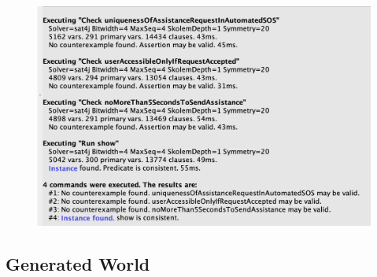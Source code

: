 \documentclass[12pt,a4paper]{article}
\begin{document}
			\begin{figure}[H]
				\centering
				\includegraphics[width=1.2\linewidth]{Images/alloy-consistency}
				\label{fig:alloy-consistency}
			\end{figure}
	\newpage
	\subsection{Generated World}
\end{document}

